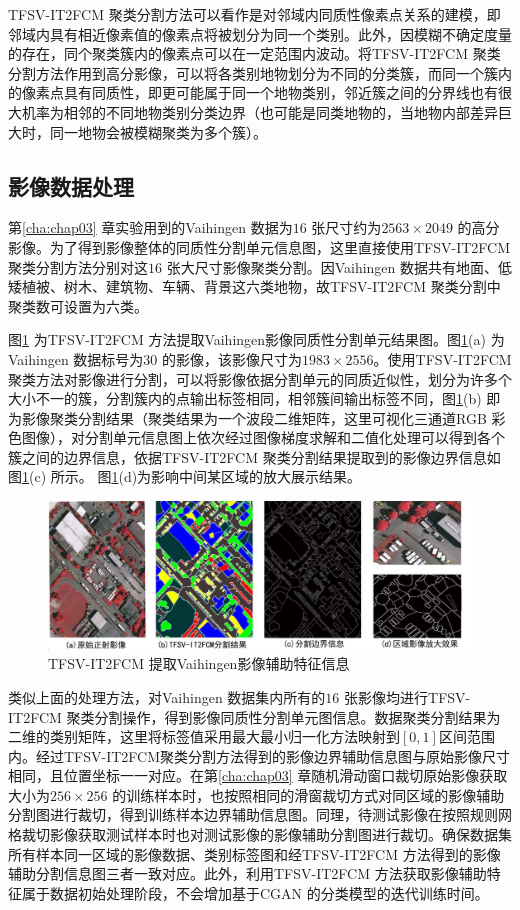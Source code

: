 TFSV-IT2FCM 聚类分割方法可以看作是对邻域内同质性像素点关系的建模，即邻域内具有相近像素值的像素点将被划分为同一个类别。此外，因模糊不确定度量的存在，同个聚类簇内的像素点可以在一定范围内波动。将TFSV-IT2FCM 聚类分割方法作用到高分影像，可以将各类别地物划分为不同的分类簇，而同一个簇内的像素点具有同质性，即更可能属于同一个地物类别，邻近簇之间的分界线也有很大机率为相邻的不同地物类别分类边界（也可能是同类地物的，当地物内部差异巨大时，同一地物会被模糊聚类为多个簇）。

\subsection{影像数据处理}
\label{subsec:chap04-2-2}
第\ref{cha:chap03} 章实验用到的Vaihingen 数据为$16$ 张尺寸约为$ 2563 \times 2049$ 的高分影像。为了得到影像整体的同质性分割单元信息图，这里直接使用TFSV-IT2FCM 聚类分割方法分别对这$16$ 张大尺寸影像聚类分割。因Vaihingen 数据共有地面、低矮植被、树木、建筑物、车辆、背景这六类地物，故TFSV-IT2FCM 聚类分割中聚类数可设置为六类。

图\ref{fig:tfsv_seg} 为TFSV-IT2FCM 方法提取Vaihingen影像同质性分割单元结果图。图\ref{fig:tfsv_seg}(a) 为Vaihingen 数据标号为$30$ 的影像，该影像尺寸为$1983\times2556$。使用TFSV-IT2FCM 聚类方法对影像进行分割，可以将影像依据分割单元的同质近似性，划分为许多个大小不一的簇，分割簇内的点输出标签相同，相邻簇间输出标签不同，图\ref{fig:tfsv_seg}(b) 即为影像聚类分割结果（聚类结果为一个波段二维矩阵，这里可视化三通道RGB 彩色图像），对分割单元信息图上依次经过图像梯度求解和二值化处理可以得到各个簇之间的边界信息，依据TFSV-IT2FCM 聚类分割结果提取到的影像边界信息如图\ref{fig:tfsv_seg}(c) 所示。 图\ref{fig:tfsv_seg}(d)为影响中间某区域的放大展示结果。

\begin{figure}[!h]
    \centering
    \includegraphics[width=1.0\textwidth]{figures/tfsv_seg}
    \caption{TFSV-IT2FCM 提取Vaihingen影像辅助特征信息}
    \label{fig:tfsv_seg}
\end{figure}

类似上面的处理方法，对Vaihingen 数据集内所有的$16$ 张影像均进行TFSV-IT2FCM 聚类分割操作，得到影像同质性分割单元图信息。数据聚类分割结果为二维的类别矩阵，这里将标签值采用最大最小归一化方法映射到$[0,1]$区间范围内。经过TFSV-IT2FCM聚类分割方法得到的影像边界辅助信息图与原始影像尺寸相同，且位置坐标一一对应。在第\ref{cha:chap03} 章随机滑动窗口裁切原始影像获取大小为$256\times 256$ 的训练样本时，也按照相同的滑窗裁切方式对同区域的影像辅助分割图进行裁切，得到训练样本边界辅助信息图。同理，待测试影像在按照规则网格裁切影像获取测试样本时也对测试影像的影像辅助分割图进行裁切。确保数据集所有样本同一区域的影像数据、类别标签图和经TFSV-IT2FCM 方法得到的影像辅助分割信息图三者一致对应。此外，利用TFSV-IT2FCM 方法获取影像辅助特征属于数据初始处理阶段，不会增加基于CGAN 的分类模型的迭代训练时间。


